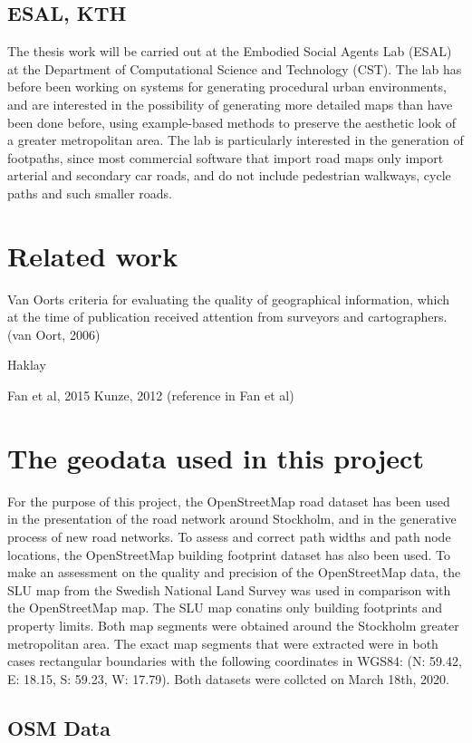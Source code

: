 \documentclass[a4paper]{article}
\begin{document}
\subsection{ESAL, KTH}
The thesis work will be carried out at the Embodied Social Agents Lab (ESAL) at the Department of Computational Science and Technology (CST). The lab has before been working on systems for generating procedural urban environments, and are interested in the possibility of generating more detailed maps than have been done before, using example-based methods to preserve the aesthetic look of a greater metropolitan area. The lab is particularly interested in the generation of footpaths, since most commercial software that import road maps only import arterial and secondary car roads, and do not include pedestrian walkways, cycle paths and such smaller roads.

\section{Related work}
Van Oorts criteria for evaluating the quality of geographical information, which at the time of publication received attention from surveyors and cartographers. (van Oort, 2006)

Haklay


Fan et al, 2015
Kunze, 2012 (reference in Fan et al)


\section{The geodata used in this project}

For the purpose of this project, the OpenStreetMap road dataset has been used in the presentation of the road network around Stockholm, and in the generative process of new road networks. To assess and correct path widths and path node locations, the OpenStreetMap building footprint dataset has also been used. To make an assessment on the quality and precision of the OpenStreetMap data, the SLU map from the Swedish National Land Survey was used in comparison with the OpenStreetMap map. The SLU map conatins only building footprints and property limits. Both map segments were obtained around the Stockholm greater metropolitan area.
The exact map segments that were extracted were in both cases rectangular boundaries with the following coordinates in WGS84: (N: 59.42, E: 18.15, S: 59.23, W: 17.79).
Both datasets were collcted on March 18th, 2020.

\subsection{OSM Data}
\end{document}
